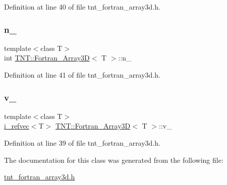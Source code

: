Definition at line 40 of file tnt\+\_\+fortran\+\_\+array3d.\+h.

\mbox{\label{classTNT_1_1Fortran__Array3D_ae717b2430033857fea81f7b5d7d4d070}} 
\subsubsection{\texorpdfstring{n\+\_\+}{n\_}}
{\footnotesize\ttfamily template$<$class T$>$ \\
int \hyperlink{classTNT_1_1Fortran__Array3D}{T\+N\+T\+::\+Fortran\+\_\+\+Array3D}$<$ T $>$\+::n\+\_\+\hspace{0.3cm}{\ttfamily [private]}}



Definition at line 41 of file tnt\+\_\+fortran\+\_\+array3d.\+h.

\mbox{\label{classTNT_1_1Fortran__Array3D_a105630010987f0da8a68203277e799bf}} 
\subsubsection{\texorpdfstring{v\+\_\+}{v\_}}
{\footnotesize\ttfamily template$<$class T$>$ \\
\hyperlink{classTNT_1_1i__refvec}{i\+\_\+refvec}$<$T$>$ \hyperlink{classTNT_1_1Fortran__Array3D}{T\+N\+T\+::\+Fortran\+\_\+\+Array3D}$<$ T $>$\+::v\+\_\+\hspace{0.3cm}{\ttfamily [private]}}



Definition at line 39 of file tnt\+\_\+fortran\+\_\+array3d.\+h.



The documentation for this class was generated from the following file\+:\begin{DoxyCompactItemize}
\item 
\hyperlink{tnt__fortran__array3d_8h}{tnt\+\_\+fortran\+\_\+array3d.\+h}\end{DoxyCompactItemize}
